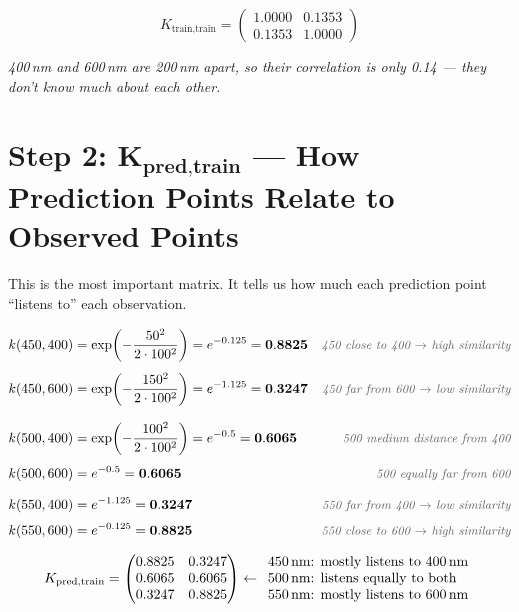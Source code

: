 \documentclass[11pt, a4paper]{article}
\newcommand{\note}[1]{{\small\color{notegreen}\textit{#1}}}
\newcommand{\expl}[1]{{\small\color{explgray}\textit{#1}}}
\begin{document}
\[
K_{\text{train,train}} =
\begin{pmatrix} 1.0000 & 0.1353 \\ 0.1353 & 1.0000 \end{pmatrix}
\]

\note{400\,nm and 600\,nm are 200\,nm apart, so their correlation is only 0.14 — they don't know much about each other.}


\section*{\color{secblue}Step 2: $\mathbf{K_{\text{pred,train}}}$ — How Prediction Points Relate to Observed Points}

This is the most important matrix. It tells us how much each prediction point ``listens to'' each observation.

\begin{align*}
k(450, 400) &= \exp\!\left(-\frac{50^2}{2 \cdot 100^2}\right) = e^{-0.125} = \mathbf{0.8825}
  & \expl{450 close to 400 $\rightarrow$ high similarity} \\[4pt]
k(450, 600) &= \exp\!\left(-\frac{150^2}{2 \cdot 100^2}\right) = e^{-1.125} = \mathbf{0.3247}
  & \expl{450 far from 600 $\rightarrow$ low similarity} \\[8pt]
k(500, 400) &= \exp\!\left(-\frac{100^2}{2 \cdot 100^2}\right) = e^{-0.5} = \mathbf{0.6065}
  & \expl{500 medium distance from 400} \\[4pt]
k(500, 600) &= e^{-0.5} = \mathbf{0.6065}
  & \expl{500 equally far from 600} \\[8pt]
k(550, 400) &= e^{-1.125} = \mathbf{0.3247}
  & \expl{550 far from 400 $\rightarrow$ low similarity} \\[4pt]
k(550, 600) &= e^{-0.125} = \mathbf{0.8825}
  & \expl{550 close to 600 $\rightarrow$ high similarity}
\end{align*}

\[
K_{\text{pred,train}} =
\begin{pmatrix}
0.8825 & 0.3247 \\
0.6065 & 0.6065 \\
0.3247 & 0.8825
\end{pmatrix}
\leftarrow
\begin{array}{l}
\text{450\,nm: mostly listens to 400\,nm} \\
\text{500\,nm: listens equally to both} \\
\text{550\,nm: mostly listens to 600\,nm}
\end{array}
\]
\end{document}
